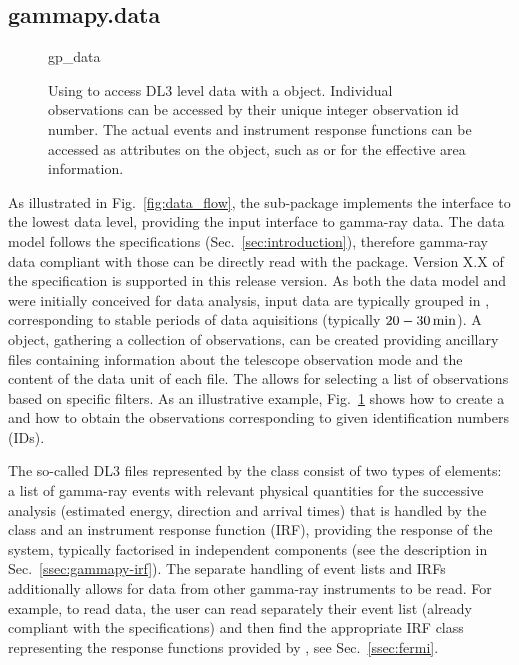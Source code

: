 \subsection{gammapy.data}
\label{ssec:gammapy-data}

\begin{figure}

	{gp_data}

	\caption{Using  to access DL3 level data with a  object.
    Individual observations can be accessed by their unique integer observation id number.
    The actual events and instrument response functions can be accessed
    as attributes on the  object, such as 
    or  for the effective area information.
    }
	\label{fig*:minted:gp_data}
\end{figure}

As illustrated in Fig.~\ref{fig:data_flow}, the  sub-package
implements the interface to the lowest data level, providing the input interface to gamma-ray
data. The \gammapy data model follows the \gadf specifications
(Sec.~\ref{sec:introduction}), therefore gamma-ray data compliant with those
can be directly read with the package. Version X.X of the \gadf specification
is supported in this release version. As both the \gadf data model and \gammapy
were initially conceived for \iact data analysis, input data are typically
grouped in , corresponding to stable periods of data
aquisitions (typically $20 - 30\,{\rm min}$). A  object,
gathering a collection of observations, can be created providing ancillary
files containing information about the telescope observation mode and the
content of the data unit of each file. The  allows for
selecting a list of observations based on specific filters. As an illustrative
example, Fig.~\ref{fig*:minted:gp_data} shows how to create a
 and how to obtain the observations corresponding to given
identification numbers (IDs).

The so-called DL3 files represented by the  class consist
of two types of elements: a list of gamma-ray events with relevant physical
quantities for the successive analysis (estimated energy, direction and arrival
times) that is handled by the  class and an instrument
response function (IRF), providing the response of the system, typically
factorised in independent components (see the description in
Sec.~\ref{ssec:gammapy-irf}). The separate handling of event lists and IRFs
additionally allows for data from other gamma-ray instruments to be read. For
example, to read \fermi data, the user can read separately their event list
(already compliant with the \gadf specifications) and then find the appropriate
IRF class representing the response functions provided by \fermi, see
Sec.~\ref{ssec:fermi}.
